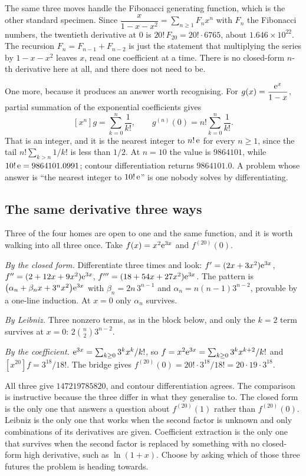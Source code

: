 The same three moves handle the Fibonacci generating function, which is the other standard specimen. Since $\dfrac{x}{1-x-x^{2}}=\sum_{n\geq1}F_{n}x^{n}$ with $F_{n}$ the Fibonacci numbers, the twentieth derivative at $0$ is $20!\,F_{20}=20!\cdot6765$, about $1.646\times10^{22}$. The recursion $F_{n}=F_{n-1}+F_{n-2}$ is just the statement that multiplying the series by $1-x-x^{2}$ leaves $x$, read one coefficient at a time. There is no closed-form $n$-th derivative here at all, and there does not need to be.

One more, because it produces an answer worth recognising. For $g(x)=\dfrac{\mathrm{e}^{x}}{1-x}$, partial summation of the exponential coefficients gives
\[
[x^{n}]g=\sum_{k=0}^{n}\frac{1}{k!},\qquad g^{(n)}(0)=n!\sum_{k=0}^{n}\frac{1}{k!} .
\]
That is an integer, and it is the nearest integer to $n!\,\mathrm{e}$ for every $n\geq1$, since the tail $n!\sum_{k>n}1/k!$ is less than $1/2$. At $n=10$ the value is $9864101$, while $10!\,\mathrm{e}=9864101.0991$; contour differentiation returns $9864101.0$. A problem whose answer is ``the nearest integer to $10!\,\mathrm{e}$'' is one nobody solves by differentiating.

\subsection{The same derivative three ways}

Three of the four homes are open to one and the same function, and it is worth walking into all three once. Take $f(x)=x^{2}\mathrm{e}^{3x}$ and $f^{(20)}(0)$.

\emph{By the closed form.} Differentiate three times and look: $f'=(2x+3x^{2})\mathrm{e}^{3x}$, $f''=(2+12x+9x^{2})\mathrm{e}^{3x}$, $f'''=(18+54x+27x^{2})\mathrm{e}^{3x}$. The pattern is $\bigl(\alpha_{n}+\beta_{n}x+3^{n}x^{2}\bigr)\mathrm{e}^{3x}$ with $\beta_{n}=2n\,3^{n-1}$ and $\alpha_{n}=n(n-1)3^{n-2}$, provable by a one-line induction. At $x=0$ only $\alpha_{n}$ survives.

\emph{By Leibniz.} Three nonzero terms, as in the block below, and only the $k=2$ term survives at $x=0$: $2\binom n2 3^{n-2}$.

\emph{By the coefficient.} $\mathrm{e}^{3x}=\sum_{k\geq0}3^{k}x^{k}/k!$, so $f=x^{2}\mathrm{e}^{3x}=\sum_{k\geq0}3^{k}x^{k+2}/k!$ and $[x^{20}]f=3^{18}/18!$. The bridge gives $f^{(20)}(0)=20!\cdot3^{18}/18!=20\cdot19\cdot3^{18}$.

All three give $147219785820$, and contour differentiation agrees. The comparison is instructive because the three differ in what they generalise to. The closed form is the only one that answers a question about $f^{(20)}(1)$ rather than $f^{(20)}(0)$. Leibniz is the only one that works when the second factor is unknown and only combinations of its derivatives are given. Coefficient extraction is the only one that survives when the second factor is replaced by something with no closed-form high derivative, such as $\ln(1+x)$. Choose by asking which of those three futures the problem is heading towards.


